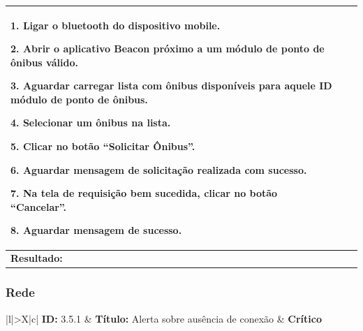 \documentclass[
	12pt,				%
	oneside,			%
	a4paper,			%
	brazil				%
]{abntex2}
\begin{document}
{\begin{apendicesenv}
\begin{table}[H]
\begin{tabularx}{\textwidth}{|l|>{\hsize=2\hsize}X|c|}
{1. Ligar o bluetooth do dispositivo mobile.

2. Abrir o aplicativo Beacon próximo a um módulo de ponto de ônibus válido.

3. Aguardar carregar lista com ônibus disponíveis para aquele ID módulo de ponto de ônibus.

4. Selecionar um ônibus na lista.

5. Clicar no botão “Solicitar Ônibus”.

6. Aguardar mensagem de solicitação realizada com sucesso.

7. Na tela de requisição bem sucedida, clicar no botão “Cancelar”.

8. Aguardar mensagem de sucesso.
} \\ 
\hline 
\multicolumn{3}{|X|}{\textbf{Resultado:}} \\ 
\hline 
\end{tabularx} 
\end{table}
\egroup

\subsubsection*{Rede}

\bgroup
\def\arraystretch{1.5}
\begin{table}[H]

\begin{tabularx}{\textwidth}{|l|>{\hsize}X|c|}
\hline 
\textbf{ID:} 3.5.1 & \textbf{Título:} Alerta sobre ausência de conexão & \textbf{Crítico} \\ 
\hline 
{} \\ 
\hline  
{} \\ 
\hline 
{} \\ 
\hline 
{} \\ 
\hline 
{} \\ 
\hline 
\end{tabularx} 
\end{table}
\egroup


\end{apendicesenv}}
\end{document}
